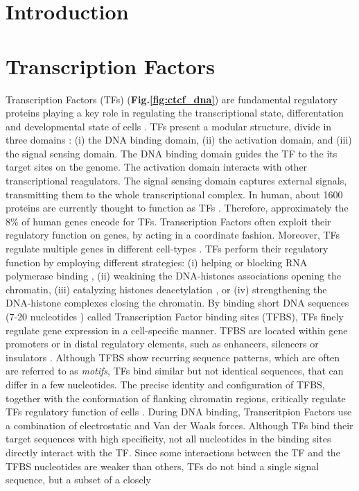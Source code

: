 \documentclass[a4paper, titlepage, 8pt, openright]{book}
\newcommand{\mychapter}[2]{
    \setcounter{chapter}{#1}
    \setcounter{section}{0}
    \chapter*{#2}
    \addcontentsline{toc}{chapter}{#2}
}
\begin{document}
\begin{frontespizio}
\end{frontespizio}
\tableofcontents
\listoffigures
\listoftables
\mychapter{1}{Introduction}
\mychapter{2}{Transcription Factors}
Transcription Factors (TFs) (\textbf{Fig.\ref{fig:ctcf_dna}}) are fundamental regulatory proteins playing a key role in regulating the transcriptional state, differentation and developmental state of cells \citep{lambert2018human, reimold2001plasma, whyte2013master}. TFs present a modular structure, divide in three domains \citep{latchman1997transcription}: (i) the DNA binding domain, (ii) the activation domain, and (iii) the signal sensing domain. The DNA binding domain guides the TF to the its target sites on the genome. The activation domain interacts with other transcriptional reagulators. The signal sensing domain captures external signals, transmitting them to the whole transcriptional complex. In human, about 1600 proteins are currently thought to function as TFs \citep{babu2004structure}. Therefore, approximately the $8$\% of human genes encode for TFs. Transcription Factors often exploit their regulatory function on genes, by acting in a coordinate fashion. Moreover, TFs regulate multiple genes in different cell-types \citep{lambert2018human}. TFs perform their regulatory function by employing different strategies: (i) helping or blocking RNA polymerase binding \citep{fuda2009defining}, (ii) weakining the DNA-histones associations opening the chromatin, (iii) catalyzing histones deacetylation \citep{liu2016beyond}, or (iv) strengthening the DNA-histone complexes closing the chromatin. By binding short DNA sequences (7-20 nucleotides \citep{stewart2012transcription}) called Transcription Factor binding sites (TFBS), TFs finely regulate gene expression in a cell-specific manner. TFBS are located within gene promoters \citep{whitfield2012functional} or in distal regulatory elements, such as enhancers, silencers or insulators \citep{gotea2010homotypic,lemon2000orchestrated,nolis2009transcription}. Although TFBS show recurring sequence patterns, which are often are referred to as \emph{motifs}, TFs bind similar but not identical sequences, that can differ in a few nucleotides. The precise identity and configuration of TFBS, together with the conformation of flanking chromatin regions, critically regulate TFs regulatory function of cells \citep{mendenhall2013locus,maurano2015large}. During DNA binding, Transcritpion Factors use a combination of electrostatic and Van der Waals forces. Although TFs bind their target sequences with high specificity, not all nucleotides in the binding sites directly interact with the TF. Since some interactions between the TF and the TFBS nucleotides are weaker than others, TFs do not bind a single signal sequence, but a subset of a closely 
\end{document}
